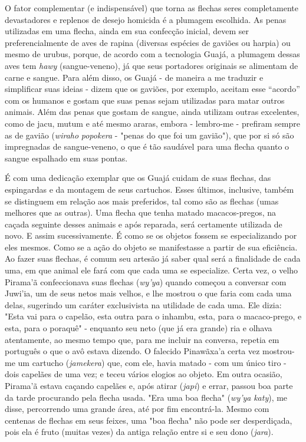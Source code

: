 O fator complementar (e indispensável) que torna as flechas seres
completamente devastadores e replenos de desejo homicida é a plumagem
escolhida. As penas utilizadas em uma flecha, ainda em sua confecção
inicial, devem ser preferencialmente de aves de rapina (diversas
espécies de gaviões ou harpia) ou mesmo de urubus, porque, de acordo com
a tecnologia Guajá, a plumagem dessas aves tem \emph{hawy}
(sangue-veneno), já que seus portadores originais se alimentam de carne
e sangue. Para além disso, os Guajá - de maneira a me traduzir e
simplificar suas ideias - dizem que os gaviões, por exemplo, aceitam
esse ``acordo'' com os humanos e gostam que suas penas sejam utilizadas
para matar outros animais. Além das penas que gostam de sangue, ainda
utilizam outras excelentes, como de jacu, mutum e até mesmo araras,
embora - lembro-me - prefiram sempre as de gavião (\emph{wiraho}
\emph{popokera} - "penas do que foi um gavião"), que por si só são
impregnadas de sangue-veneno, o que é tão saudável para uma flecha
quanto o sangue espalhado em suas pontas.

É com uma dedicação exemplar que os Guajá cuidam de suas flechas, das
espingardas e da montagem de seus cartuchos. Esses últimos, inclusive,
também se distinguem em relação aos mais preferidos, tal como são as
flechas (umas melhores que as outras). Uma flecha que tenha matado
macacos-pregos, na caçada seguinte desses animais e após reparada, será
certamente utilizada de novo. E assim sucessivamente. É como se os
objetos fossem se especializando por eles mesmos. Como se a ação do
objeto se manifestasse a partir de sua eficiência. Ao fazer suas
flechas, é comum seu artesão já saber qual será a finalidade de cada
uma, em que animal ele fará com que cada uma se especialize. Certa vez,
o velho Pirama'ã confeccionava suas flechas (\emph{wy'ya}) quando
começou a conversar com Juwi'ia, um de seus netos mais velhos, e lhe
mostrou o que faria com cada uma delas, sugerindo um caráter
exclusivista na utilidade de cada uma. Ele dizia: "Esta vai para o
capelão, esta outra para o inhambu, esta, para o macaco-prego, e esta,
para o poraquê" - enquanto seu neto (que já era grande) ria e olhava
atentamente, ao mesmo tempo que, para me incluir na conversa, repetia em
português o que o avô estava dizendo. O falecido Pinawãxa'a certa vez
mostrou-me um cartucho (\emph{jamekera}) que, com ele, havia matado -
com um único tiro - dois capelães de uma vez; e teceu vários elogios ao
objeto. Em outra ocasião, Pirama'ã estava caçando capelães e, após
atirar (\emph{japi}) e errar, passou boa parte da tarde procurando pela
flecha usada. "Era uma boa flecha" (\emph{wy'ya} \emph{katy}), me disse,
percorrendo uma grande área, até por fim encontrá-la. Mesmo com centenas
de flechas em seus feixes, uma "boa flecha" não pode ser desperdiçada,
pois ela é fruto (muitas vezes) da antiga relação entre si e seu dono
(\emph{jara}).

